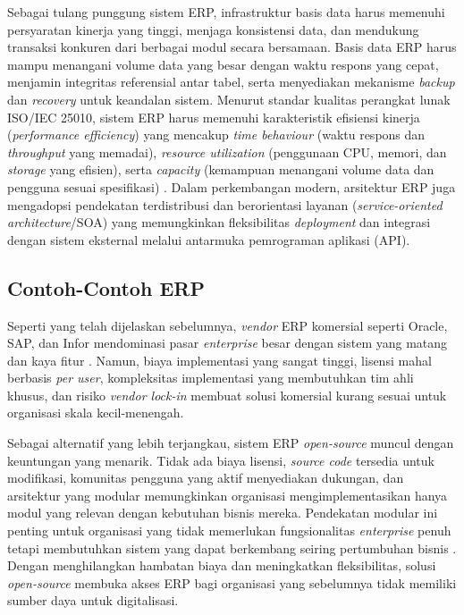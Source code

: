 Sebagai tulang punggung sistem ERP, infrastruktur basis data harus memenuhi persyaratan kinerja yang tinggi, menjaga konsistensi data, dan mendukung transaksi konkuren dari berbagai modul secara bersamaan. Basis data ERP harus mampu menangani volume data yang besar dengan waktu respons yang cepat, menjamin integritas referensial antar tabel, serta menyediakan mekanisme \textit{backup} dan \textit{recovery} untuk keandalan sistem. Menurut standar kualitas perangkat lunak ISO/IEC 25010, sistem ERP harus memenuhi karakteristik efisiensi kinerja (\textit{performance efficiency}) yang mencakup \textit{time behaviour} (waktu respons dan \textit{throughput} yang memadai), \textit{resource utilization} (penggunaan CPU, memori, dan \textit{storage} yang efisien), serta \textit{capacity} (kemampuan menangani volume data dan pengguna sesuai spesifikasi) \cite{iso25010}. Dalam perkembangan modern, arsitektur ERP juga mengadopsi pendekatan terdistribusi dan berorientasi layanan (\textit{service-oriented architecture}/SOA) yang memungkinkan fleksibilitas \textit{deployment} dan integrasi dengan sistem eksternal melalui antarmuka pemrograman aplikasi (API).

\subsection{Contoh-Contoh ERP}

Seperti yang telah dijelaskan sebelumnya, \textit{vendor} ERP komersial seperti Oracle, SAP, dan Infor mendominasi pasar \textit{enterprise} besar dengan sistem yang matang dan kaya fitur \cite{goldston2020evolution}. Namun, biaya implementasi yang sangat tinggi, lisensi mahal berbasis \textit{per user}, kompleksitas implementasi yang membutuhkan tim ahli khusus, dan risiko \textit{vendor lock-in} membuat solusi komersial kurang sesuai untuk organisasi skala kecil-menengah.

Sebagai alternatif yang lebih terjangkau, sistem ERP \textit{open-source} muncul dengan keuntungan yang menarik. Tidak ada biaya lisensi, \textit{source code} tersedia untuk modifikasi, komunitas pengguna yang aktif menyediakan dukungan, dan arsitektur yang modular memungkinkan organisasi mengimplementasikan hanya modul yang relevan dengan kebutuhan bisnis mereka. Pendekatan modular ini penting untuk organisasi yang tidak memerlukan fungsionalitas \textit{enterprise} penuh tetapi membutuhkan sistem yang dapat berkembang seiring pertumbuhan bisnis \cite{boza2015}. Dengan menghilangkan hambatan biaya dan meningkatkan fleksibilitas, solusi \textit{open-source} membuka akses ERP bagi organisasi yang sebelumnya tidak memiliki sumber daya untuk digitalisasi.

